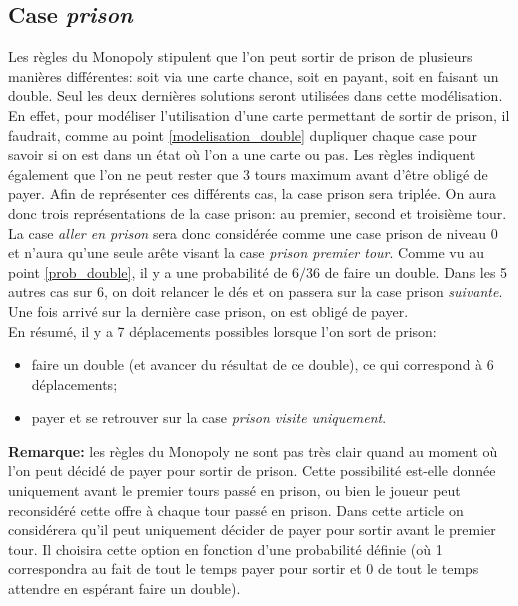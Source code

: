 \documentclass[letterpaper]{article}
\begin{document}
  \subsection{Case \textit{prison}}
    \label{case_prison}
    Les règles du Monopoly stipulent que l'on peut sortir de prison de 
    plusieurs manières différentes: soit via une carte chance, soit en 
    payant, soit en faisant un double. Seul les deux dernières solutions 
    seront utilisées dans cette modélisation. En effet, pour modéliser 
    l'utilisation d'une carte permettant de sortir de prison, il faudrait, 
    comme au point \ref{modelisation_double} dupliquer chaque case 
    pour savoir si on est dans un état où l'on a une carte ou pas.  
    Les règles indiquent également que l'on ne peut rester que 3 tours 
    maximum avant d'être obligé de payer. Afin de représenter ces 
    différents cas, la case prison sera triplée. On aura donc trois 
    représentations de la case prison: au premier, second et troisième 
    tour. La case \textit{aller en prison} sera donc considérée comme 
    une case prison de niveau 0 et n'aura qu'une seule arête visant la 
    case \textit{prison premier tour}. Comme vu au point \ref{prob_double}, 
    il y a une probabilité de $6/36$ de faire un double.  Dans les 5 
    autres cas sur 6, on doit relancer le dés et on passera sur la case 
    prison \textit{suivante}. Une fois arrivé sur la dernière case 
    prison, on est obligé de payer.\\
    En résumé, il y a 7 déplacements possibles lorsque l'on sort de
    prison:
    \begin{itemize}
      \item faire un double (et avancer du résultat de ce double), 
	ce qui correspond à 6 déplacements;
      \item payer et se retrouver sur la case \textit{prison visite 
	uniquement}.
    \end{itemize}
    \textbf{Remarque:} les règles du Monopoly ne sont pas très clair
    quand au moment où l'on peut décidé de payer pour sortir de prison.
    Cette possibilité est-elle donnée uniquement avant le premier tours 
    passé en prison, ou bien le joueur peut reconsidéré cette offre à
    chaque tour passé en prison.  Dans cette article on considérera qu'il
    peut uniquement décider de payer pour sortir avant le premier tour.
    Il choisira cette option en fonction d'une probabilité définie (où
    1 correspondra au fait de tout le temps payer pour sortir et 0 de
    tout le temps attendre en espérant faire un double).
    
\end{document}
